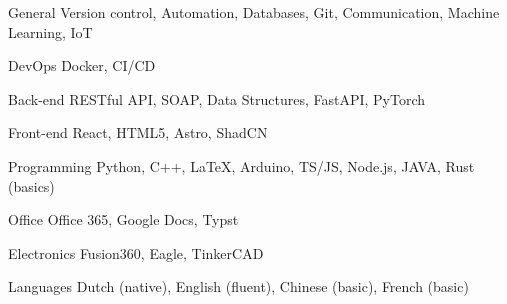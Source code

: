 
\begin{cvskills}

    \cvskill
    {General} %
    {Version control, Automation, Databases, Git, Communication, Machine Learning, IoT} %

    \cvskill
    {DevOps} %
    {Docker, CI/CD} %

    \cvskill
    {Back-end} %
    {RESTful API, SOAP, Data Structures, FastAPI, PyTorch} %

    \cvskill
    {Front-end} %
    {React, HTML5, Astro, ShadCN} %

    \cvskill
    {Programming} %
    {Python, C++, LaTeX, Arduino, TS/JS, Node.js, JAVA, Rust (basics)} %

    \cvskill
    {Office} %
    {Office 365, Google Docs, Typst} %

    \cvskill
    {Electronics} %
    {Fusion360, Eagle, TinkerCAD} %

    \cvskill
    {Languages} %
    {Dutch (native), English (fluent), Chinese (basic), French (basic)} %

\end{cvskills}
